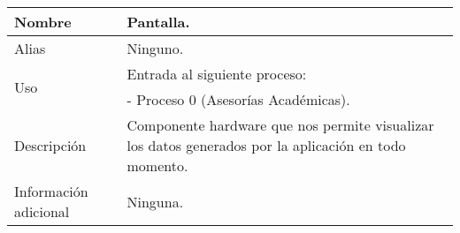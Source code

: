 \begin{center}
  \begin{tabular}{| l | p{9cm} |}
    \hline
    Nombre & \textbf{Pantalla}.\\
    \hline
    Alias & Ninguno.\\
    \hline
    \multirow{2}{*}{Uso} & Entrada al siguiente proceso:\\
                         & - Proceso 0 (Asesorías Académicas).\\
    \hline
    Descripción & Componente hardware que nos permite visualizar los datos
                  generados por la aplicación en todo momento.\\
    \hline
    Información adicional & Ninguna.\\
    \hline
  \end{tabular}
\end{center}
